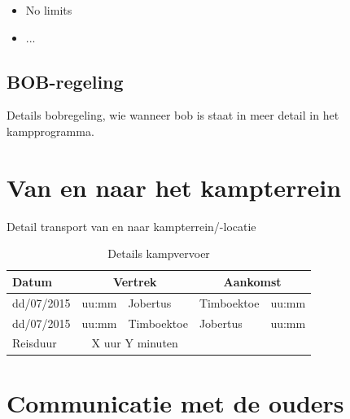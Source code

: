 \documentclass[fleqn,10pt]{src/KampSjabloon}
\newcommand{\kampplaats}{Timboektoe}
\begin{document}
\begin{itemize}

\item No limits
\item ...

\end{itemize}

\subsection*{BOB-regeling}

Details bobregeling, wie wanneer bob is staat in meer detail in het kampprogramma.


\section{Van en naar het kampterrein}
Detail transport van en naar kampterrein/-locatie

\begin{table}[H]
\centering
\begin{tabularx}{8.5cm}{llXXl}
\toprule
\textbf{Datum} & \multicolumn{2}{c}{\textbf{Vertrek}} & \multicolumn{2}{c}{\textbf{Aankomst}} \\
\toprule

 dd/07/2015 & uu:mm &  Jobertus & \kampplaats & uu:mm \\
 dd/07/2015 & uu:mm &  \kampplaats & Jobertus & uu:mm \\

\toprule
Reisduur & \multicolumn{2}{c}{X uur Y minuten}& & \\
\bottomrule
\end{tabularx}
\caption{Details kampvervoer}
\end{table}


\section{Communicatie met de ouders}
\end{document}
